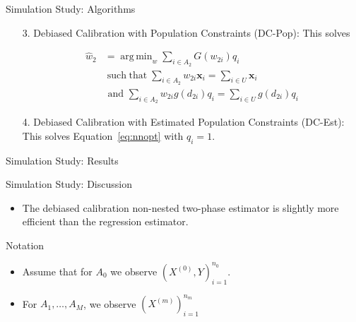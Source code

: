 \documentclass{beamer} %
\DeclareMathOperator*{\argmin}{arg\,min}
\DeclareMathOperator*{\suchthat}{such\; that}
\renewcommand{\bf}[1]{\mathbf{#1}}
\begin{document}
\begin{frame}{Simulation Study: Algorithms}

  \begin{itemize}
    \item[3.] Debiased Calibration with Population Constraints (DC-Pop): This 
      solves 

    \begin{align*}
      \hat w_2 
      &= \argmin_w \sum_{i \in A_2} G(w_{2i}) q_i \\
      &\suchthat
      \sum_{i \in A_2} w_{2i} \bf x_i = \sum_{i \in U} \bf x_i \\
      &\text{ and } 
      \sum_{i \in A_2} w_{2i} g(d_{2i}) q_i = \sum_{i \in U} g(d_{2i}) q_i
    \end{align*}

    \item[4.] Debiased Calibration with Estimated Population Constraints (DC-Est):
      This solves Equation~\eqref{eq:nnopt} with $q_i = 1$.
  \end{itemize}

\end{frame}

\begin{frame}{Simulation Study: Results}

\begin{table}[ht!]
  \centering

\caption{This table shows the results of Simulation Study 2. It displays the
Bias, RMSE, empirical 95\% confidence interval, and a t-statistic assessing the
unbiasedness of each estimator for the estimators: HT, Reg, DC-Pop, and
DC-Est.}
\label{tab:nndc-mean}
\end{table}

\end{frame}

\begin{frame}{Simulation Study: Discussion}

  \begin{itemize}
    \item The debiased calibration non-nested two-phase estimator is
      slightly more efficient than the regression estimator.
  \end{itemize}

\end{frame}

\begin{frame}{Notation}

  \begin{itemize}
    \item Assume that for $A_0$ we observe $(X^{(0)}, Y)_{i = 1}^{n_0}$.
    \item For $A_1, \dots, A_M$, we observe $(X^{(m)})_{i = 1}^{n_m}$
  \end{itemize}

\end{frame}
\end{document}

